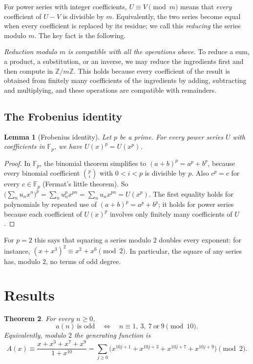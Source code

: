 \documentclass[11pt,a4paper]{article}
\newtheorem{theorem}{Theorem}[section]
\newtheorem{lemma}[theorem]{Lemma}
\theoremstyle{definition}
\theoremstyle{remark}
\newcommand{\Z}{\mathbb{Z}}
\newcommand{\F}{\mathbb{F}}
\begin{document}
For power series with integer coefficients, $U\equiv V\pmod m$ means that \emph{every} coefficient of $U-V$ is
divisible by $m$. Equivalently, the two series become equal when every coefficient is replaced by its residue; we call
this \emph{reducing} the series modulo $m$. The key fact is the following.

\emph{Reduction modulo $m$ is compatible with all the operations above.} To reduce a sum, a product, a substitution, or
an inverse, we may reduce the ingredients first and then compute in $\Z/m\Z$. This holds because every
coefficient of the result is obtained from finitely many coefficients of the ingredients by adding, subtracting and
multiplying, and these operations are compatible with remainders.

\subsection{The Frobenius identity}
\begin{lemma}[Frobenius identity]\label{lem:frobenius}
Let $p$ be a prime. For every power series $U$ with coefficients in $\F_p$, we have $U(x)^p=U(x^p)$.
\end{lemma}

\begin{proof}
In $\F_p$, the binomial theorem simplifies to $(a+b)^p=a^p+b^p$, because every binomial coefficient
$\binom pi$ with $0<i<p$ is divisible by $p$. Also $c^p=c$ for every $c\in\F_p$ (Fermat's little theorem). So
$\bigl(\sum_nu_nx^n\bigr)^p=\sum_nu_n^px^{pn}=\sum_nu_nx^{pn}=U(x^p)$. The first equality holds for polynomials by
repeated use of $(a+b)^p=a^p+b^p$; it holds for power series because each coefficient of $U(x)^p$ involves only finitely
many coefficients of $U$.
\end{proof}

For $p=2$ this says that squaring a series modulo $2$ doubles every exponent: for instance,
$(x+x^3)^2\equiv x^2+x^6\pmod2$. In particular, the square of any series has, modulo $2$, no terms of odd degree.

\section{Results}\label{sec:results}

\begin{theorem}\label{thm:main}
For every $n\ge0$,
\[
a(n)\ \text{is odd}\quad\Longleftrightarrow\quad n\equiv 1,\ 3,\ 7\ \text{or}\ 9 \pmod{10}.
\]
Equivalently, modulo $2$ the generating function is
\begin{equation}\label{eq:key}
A(x)\equiv\frac{x+x^3+x^7+x^9}{1+x^{10}}=\sum_{j\ge0}\bigl(x^{10j+1}+x^{10j+3}+x^{10j+7}+x^{10j+9}\bigr)\pmod 2 .
\end{equation}
\end{theorem}
\end{document}
